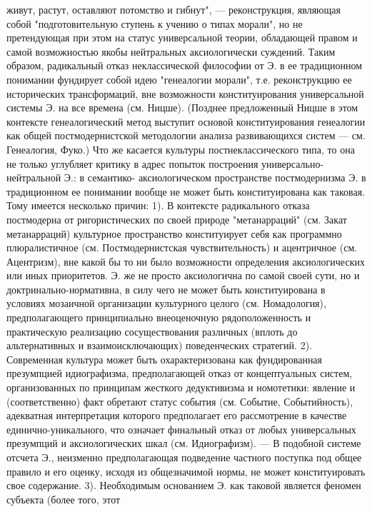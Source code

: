 \documentclass[12pt]{article}
\begin{document}
живут, растут, оставляют потомство и гибнут", — реконструкция, являющая собой "подготовительную ступень
к учению о типах морали", но не претендующая при этом на статус универсальной теории, обладающей правом
и  самой  возможностью  якобы  нейтральных  аксиологически  суждений.  Таким  образом,  радикальный  отказ
неклассической философии от Э. в ее традиционном понимании фундирует собой идею "генеалогии морали",
т.е.  реконструкцию  ее  исторических  трансформаций,  вне  возможности  конституирования  универсальной
системы Э. на все времена (см. Ницше). (Позднее предложенный Ницше в этом контексте генеалогический
метод выступит основой конституирования генеалогии как общей постмодернистской методологии анализа
развивающихся систем — см. Генеалогия, Фуко.) Что же касается культуры постнеклассического типа, то она не
только  углубляет  критику  в  адрес  попыток  построения  универсально-нейтральной  Э.:  в  семантико-
аксиологическом  пространстве  постмодернизма  Э.  в  традиционном  ее  понимании  вообще  не  может  быть
конституирована как таковая. Тому имеется несколько причин: 1). В контексте радикального отказа постмодерна
от  ригористических  по  своей  природе  "метанарраций"  (см.  Закат  метанарраций)  культурное  пространство
конституирует себя как программно плюралистичное (см. Постмодернистская чувствительность) и ацентричное
(см. Ацентризм), вне какой бы то ни было возможности определения аксиологических или иных приоритетов.
Э. же не просто аксиологична по самой своей сути, но и доктринально-нормативна, в силу чего не может быть
конституирована в условиях мозаичной организации культурного целого (см. Номадология), предполагающего
принципиально  внеоценочную  рядоположенность  и  практическую  реализацию  сосуществования  различных
(вплоть до альтернативных и взаимоисключающих) поведенческих стратегий. 2). Современная культура может
быть  охарактеризована  как  фундированная  презумпцией  идиографизма,  предполагающей  отказ  от
концептуальных  систем,  организованных  по  принципам  жесткого  дедуктивизма  и  номотетики:  явление  и
(соответственно)  факт  обретают  статус  события  (см.  Событие,  Событийность),  адекватная  интерпретация
которого предполагает его рассмотрение в качестве единично-уникального, что означает финальный отказ от
любых универсальных презумпций и аксиологических шкал (см. Идиографизм). — В подобной системе отсчета
Э., неизменно предполагающая подведение частного поступка под общее правило и его оценку, исходя из
общезначимой нормы, не может конституировать
 свое содержание. 3). Необходимым основанием Э. как таковой является феномен субъекта (более того, этот
\end{document}

